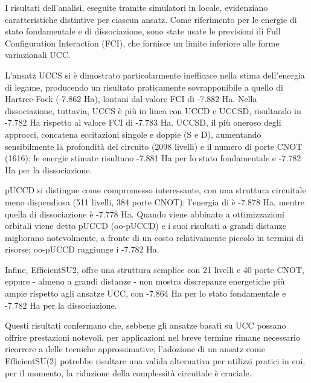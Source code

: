 I risultati dell’analisi, eseguite tramite simulatori in locale, evidenziano caratteristiche distintive per ciascun ansatz. Come riferimento per le energie di stato fondamentale e di dissociazione, sono state usate le previsioni di Full Configuration Interaction (FCI), che fornisce un limite inferiore alle forme variazionali UCC.

L’ansatz UCCS si è dimostrato particolarmente inefficace nella stima dell’energia di legame, producendo un risultato praticamente sovrapponibile a quello di Hartree-Fock (-7.862 Ha), lontani dal valore FCI di -7.882 Ha. Nella dissociazione, tuttavia, UCCS è più in linea con UCCD e UCCSD, risultando in -7.782 Ha rispetto al valore FCI di -7.783 Ha. UCCSD, il più oneroso degli approcci, concatena eccitazioni singole e doppie (S e D), aumentando sensibilmente la profondità del circuito (2098 livelli) e il numero di porte CNOT (1616); le energie stimate risultano -7.881 Ha per lo stato fondamentale e -7.782 Ha per la dissociazione.

pUCCD si distingue come compromesso interessante, con una struttura circuitale meno dispendiosa (511 livelli, 384 porte CNOT): l’energia di  è -7.878 Ha, mentre quella di dissociazione è -7.778 Ha. Quando viene abbinato a ottimizzazioni orbitali viene detto  pUCCD (oo-pUCCD) e i suoi risultati a grandi distanze migliorano notevolmente, a fronte di un costo relativamente piccolo in termini di risorse: oo-pUCCD raggiunge i -7.782 Ha.

Infine, EfficientSU2, offre una struttura semplice con 21 livelli e 40 porte CNOT, eppure - almeno a grandi distanze - non mostra discrepanze energetiche  più ampie rispetto agli ansatze UCC, con -7.864 Ha per lo stato fondamentale e -7.782 Ha per la dissociazione.

Questi risultati confermano che, sebbene gli ansatze basati su UCC possano offrire prestazioni notevoli, per applicazioni nel breve termine rimane necessario ricorrere a delle tecniche approssimative; l’adozione di un ansatz  come EfficientSU(2) potrebbe risultare una valida alternativa per utilizzi pratici in cui, per il momento, la riduzione della complessità circuitale è cruciale.